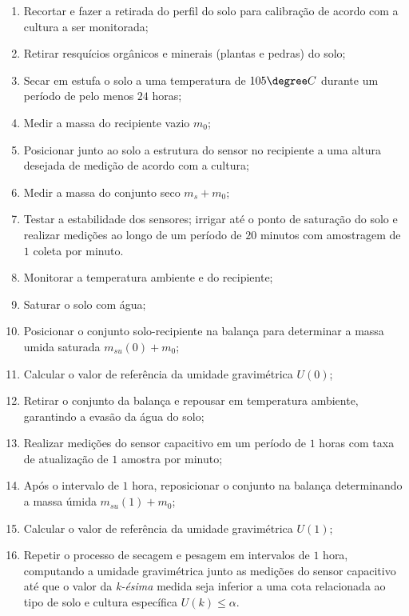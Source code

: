 \begin{itemize}
			\begin{enumerate}
				\item Recortar e fazer a retirada do perfil do solo para calibração de acordo com a cultura a ser monitorada;
				\item Retirar resquícios orgânicos e minerais (plantas e pedras) do solo;
				\item Secar em estufa o solo a uma temperatura de $105 \degree C$ durante um período de pelo menos $24$ horas;
				\item Medir a massa do recipiente vazio $m_0$;
				\item Posicionar junto ao solo a estrutura do sensor no recipiente a uma altura desejada de medição de acordo com a cultura;
				\item Medir a massa do conjunto seco $m_s+m_0$;
				\item Testar a estabilidade dos sensores; irrigar até o ponto de saturação do solo e realizar medições ao longo de um período de $20$ minutos com amostragem de $1$ coleta por minuto. 
				\item Monitorar a temperatura ambiente e do recipiente;
				\item Saturar o solo com água;
				\item Posicionar o conjunto solo-recipiente na balança para determinar a massa umida saturada $m_{su}(0)+m_0$;
				\item Calcular o valor de referência da umidade gravimétrica $U(0)$;
				\item Retirar o conjunto da balança e repousar em temperatura ambiente, garantindo a evasão da água do solo;
				\item Realizar medições do sensor capacitivo em um período de $1$ horas com taxa de atualização de $1$ amostra por minuto;
				\item Após o intervalo de $1$ hora, reposicionar o conjunto na balança determinando a massa úmida $m_{su}(1)+m_0$;
				\item Calcular o valor de referência da umidade gravimétrica $U(1)$;
				\item Repetir o processo de secagem e pesagem em intervalos de $1$ hora, computando a umidade gravimétrica junto as medições do sensor capacitivo até que o valor da \textit{k-ésima} medida seja inferior a uma cota relacionada ao tipo de solo e cultura específica $U(k) \leq \alpha$. 
			\end{enumerate}	

		\end{itemize}
		
